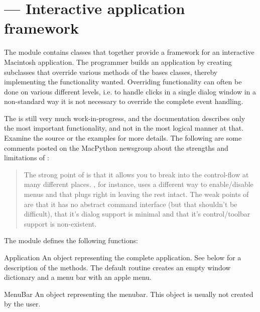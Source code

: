\section{ ---
         Interactive application framework}



The  module contains classes that together provide a
framework for an interactive Macintosh application. The programmer
builds an application by creating subclasses that override various
methods of the bases classes, thereby implementing the functionality
wanted. Overriding functionality can often be done on various
different levels, i.e. to handle clicks in a single dialog window in a
non-standard way it is not necessary to override the complete event
handling.

The  is still very much work-in-progress, and the
documentation describes only the most important functionality, and not
in the most logical manner at that. Examine the source or the examples
for more details.  The following are some comments posted on the
MacPython newsgroup about the strengths and limitations of
:

\begin{quotation}
The strong point of  is that it allows you to break
into the control-flow at many different places. , for
instance, uses a different way to enable/disable menus and that plugs
right in leaving the rest intact.  The weak points of
 are that it has no abstract command interface (but
that shouldn't be difficult), that it's dialog support is minimal and
that it's control/toolbar support is non-existent.
\end{quotation}


The  module defines the following functions:


\begin{funcdesc}{Application}{}
An object representing the complete application. See below for a
description of the methods. The default  routine
creates an empty window dictionary and a menu bar with an apple menu.
\end{funcdesc}

\begin{funcdesc}{MenuBar}{}
An object representing the menubar. This object is usually not created
by the user.
\end{funcdesc}

